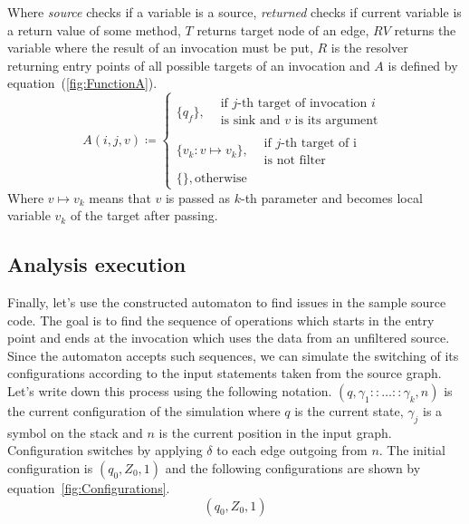 Where \textit{source} checks if a variable is a source, \textit{returned} checks if current variable is a return value of some method, $T$ returns target node of an edge, $RV$ returns the variable where the result of an invocation must be put, $R$ is the resolver returning entry points of all possible targets of an invocation and $A$ is defined by equation~(\ref{fig:FunctionA}).
\begin{equation}
	\label{fig:FunctionA}
	A(i, j, v) \coloneqq 
	\begin{cases}
		\{q_f\},  \begin{split}&\textrm{if $j$-th target of invocation $i$} \\ & \textrm{is sink and $v$ is its argument}\end{split} \\
			\{v_k: v \mapsto v_k\}, \begin{split}&\textrm{if $j$-th target of i} \\ & \textrm{is not filter}\end{split} \\
		\{\}, \textrm{otherwise}
	\end{cases}
\end{equation}
Where $v \mapsto v_k$ means that $v$ is passed as $k$-th parameter and becomes local variable $v_k$ of the target after passing.

\subsection{Analysis execution}

Finally, let's use the constructed automaton to find issues in the sample source code.
The goal is to find the sequence of operations which starts in the entry point and ends at the invocation which uses the data from an unfiltered source.
Since the automaton accepts such sequences, we can simulate the switching of its configurations according to the input statements taken from the source graph.
Let's write down this process using the following notation.
$(q, \gamma_1 :: \ldots :: \gamma_k, n)$ is the current configuration of the simulation where $q$ is the current state, $\gamma_j$ is a symbol on the stack and $n$ is the current position in the input graph.
Configuration switches by applying $\delta$ to each edge outgoing from $n$.
The initial configuration is $(q_0, Z_0, 1)$ and the following configurations are shown by equation~\ref{fig:Configurations}.
\begin{equation}
	\label{fig:Configurations}
	(q_0, Z_0, 1)
\end{equation}
